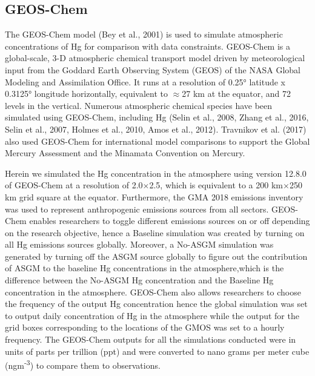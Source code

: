 \subsection{GEOS-Chem}
\begin{flushleft}
The GEOS-Chem model (Bey et al., 2001) is used to simulate atmospheric concentrations of Hg for comparison with data constraints. GEOS-Chem is a global-scale, 3-D atmospheric chemical transport model driven by meteorological input from the Goddard Earth Observing System (GEOS) of the NASA Global Modeling and Assimilation Office. It runs at a resolution of 0.25° latitude x 0.3125° longitude horizontally, equivalent to $\approx$27 km at the equator, and 72 levels in the vertical. Numerous atmospheric chemical species have been simulated using GEOS-Chem, including Hg (Selin et al., 2008, Zhang et al., 2016, Selin et al., 2007, Holmes et al., 2010, Amos et al., 2012). Travnikov et al. (2017) also used GEOS-Chem for international model comparisons to support the Global Mercury Assessment and the Minamata Convention on Mercury.
\end{flushleft}
\begin{flushleft}

Herein we simulated the Hg concentration in the atmosphere using version 12.8.0 of GEOS-Chem at a resolution of 2.0$\times$2.5, which is equivalent to a 200 km$\times$250 km grid square at the equator. Furthermore, the GMA 2018 emissions inventory was used to represent anthropogenic emissions sources from all sectors. GEOS-Chem enables researchers to toggle different emissions sources on or off depending on the research objective, hence a Baseline simulation was created by turning on all Hg emissions sources globally. Moreover, a No-ASGM simulation was generated by turning off the ASGM source globally to figure out the contribution of ASGM to the baseline Hg concentrations in the atmosphere,which is the difference between the No-ASGM Hg concentration and the Baseline Hg concentration in the atmosphere. GEOS-Chem also allows researchers to choose the frequency of the output Hg concentration hence the global simulation was set to output daily concentration of Hg in the atmosphere while the output for the grid boxes corresponding to the locations of the GMOS was set to a hourly frequency. The GEOS-Chem outputs for all the simulations conducted were in units of parts per trillion (ppt) and were converted to nano grams per meter cube (ngm\textsuperscript{-3}) to compare them to observations.
\end{flushleft}

